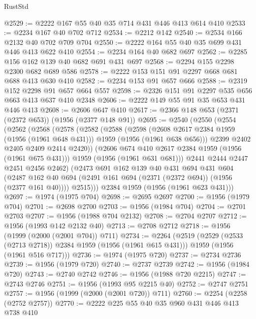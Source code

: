 \begin{lexlean}{RustStd}
\begin{coremodule}
@2529 := @2222 @167 @55 @40 @35 @714 @431 @446 @413 @614 @410
@2533 := @2234 @167 @40 @702 @712
@2534 := @2212 @142
@2540 := @2534 @166 @2132 @40 @702 @709 @704
@2550 := @2222 @164 @55 @40 @35 @699 @431 @446 @413 @622 @410
@2554 := @2234 @164 @40 @682 @697
@2562 := @2285 @156 @162 @139 @40 @682 @691 @431 @697
@2568 := @2294 @155 @2298 @2300 @682 @689 @586
@2578 := @2222 @153 @151 @91 @2297 @668 @681 @688 @413 @630 @410
@2582 := @2234 @153 @91 @657 @666
@2588 := @2319 @152 @2298 @91 @657 @664 @557
@2598 := @2326 @151 @91 @2297 @535 @656 @663 @413 @637 @410 @2348
@2606 := @2222 @149 @55 @91 @35 @653 @431 @446 @413
@2608 := @2606 @647 @410
@2617 := @2366 @148 @653 (@2371 (@2372 @653)) (@1956 (@2377 @148 @91))
@2695 := @2540
    (@2550
      (@2554
        (@2562
          (@2568
            (@2578
              (@2582
                (@2588
                  (@2598
                    (@2608 @2617 @2384 @1959 (@1956 (@1961 @648 @431)))
                    @1959
                    (@1956 (@1961 @638 @656)))
                  @2399
                  @2402
                  @2405
                  @2409
                  @2414
                  @2420))
              (@2606 @674 @410 @2617 @2384 @1959 (@1956 (@1961 @675 @431)))
              @1959
              (@1956 (@1961 @631 @681)))
            @2441
            @2444
            @2447
            @2451
            @2456
            @2462)
          (@2473
            @691
            @162
            @139
            @40
            @431
            @694
            @431
            @604
            (@2487 @162 @40 @694 (@2491 @161 @694 (@2371 (@2372 @694)) (@1956 (@2377 @161 @40))))
            @2515)))
      @2384
      @1959
      (@1956 (@1961 @623 @431)))
@2697 := @1974 (@1975 @704)
@2698 := @2695 @2697
@2700 := @1956 (@1979 @704)
@2701 := @2698 @2700
@2703 := @1956 (@1984 @704)
@2704 := @2701 @2703
@2707 := @1956 (@1988 @704 @2132)
@2708 := @2704 @2707
@2712 := @1956 (@1993 @142 @2132 @40)
@2713 := @2708 @2712
@2718 := @1956 (@1999 (@2000 (@2001 @704)) @711)
@2734 := @2264
    (@2519
      (@2529 (@2533 (@2713 @2718)) @2384 @1959 (@1956 (@1961 @615 @431)))
      @1959
      (@1956 (@1961 @516 @717)))
@2736 := @1974 (@1975 @720)
@2737 := @2734 @2736
@2739 := @1956 (@1979 @720)
@2740 := @2737 @2739
@2742 := @1956 (@1984 @720)
@2743 := @2740 @2742
@2746 := @1956 (@1988 @720 @2215)
@2747 := @2743 @2746
@2751 := @1956 (@1993 @95 @2215 @40)
@2752 := @2747 @2751
@2757 := @1956 (@1999 (@2000 (@2001 @720)) @711)
@2760 := @2254 (@2258 (@2752 @2757))
@2770 := @2222 @225 @55 @40 @35 @960 @431 @446 @413 @738 @410

\end{coremodule}
\end{lexlean}
